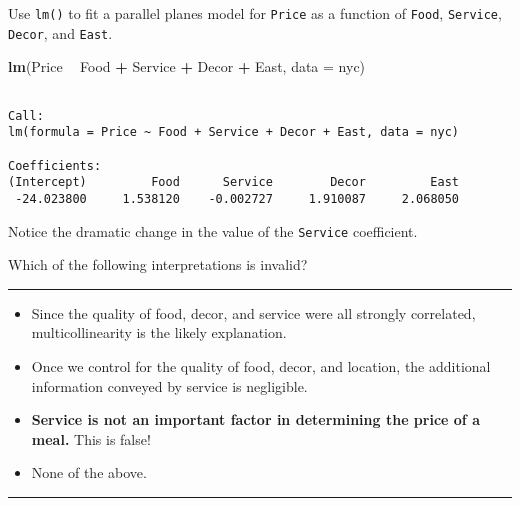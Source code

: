 \documentclass[]{book}
\newenvironment{Shaded}{\begin{snugshade}}{\end{snugshade}}
\newcommand{\KeywordTok}[1]{\textcolor[rgb]{0.13,0.29,0.53}{\textbf{#1}}}
\newcommand{\DataTypeTok}[1]{\textcolor[rgb]{0.13,0.29,0.53}{#1}}
\newcommand{\StringTok}[1]{\textcolor[rgb]{0.31,0.60,0.02}{#1}}
\newcommand{\OperatorTok}[1]{\textcolor[rgb]{0.81,0.36,0.00}{\textbf{#1}}}
\newcommand{\NormalTok}[1]{#1}
\begin{document}
Use \texttt{lm()} to fit a parallel planes model for \texttt{Price} as a
function of \texttt{Food}, \texttt{Service}, \texttt{Decor}, and
\texttt{East}.

\begin{Shaded}
\begin{Highlighting}[]
\KeywordTok{lm}\NormalTok{(Price }\OperatorTok{~}\StringTok{ }\NormalTok{Food }\OperatorTok{+}\StringTok{ }\NormalTok{Service }\OperatorTok{+}\StringTok{ }\NormalTok{Decor }\OperatorTok{+}\StringTok{ }\NormalTok{East, }\DataTypeTok{data =}\NormalTok{ nyc)}
\end{Highlighting}
\end{Shaded}

\begin{verbatim}

Call:
lm(formula = Price ~ Food + Service + Decor + East, data = nyc)

Coefficients:
(Intercept)         Food      Service        Decor         East  
 -24.023800     1.538120    -0.002727     1.910087     2.068050  
\end{verbatim}

Notice the dramatic change in the value of the \texttt{Service}
coefficient.

Which of the following interpretations is invalid?

\begin{center}\rule{0.5\linewidth}{\linethickness}\end{center}

\begin{itemize}
\item
  Since the quality of food, decor, and service were all strongly
  correlated, multicollinearity is the likely explanation.
\item
  Once we control for the quality of food, decor, and location, the
  additional information conveyed by service is negligible.
\item
  \textbf{Service is not an important factor in determining the price of
  a meal.} This is false!
\item
  None of the above.
\end{itemize}

\begin{center}\rule{0.5\linewidth}{\linethickness}\end{center}


\end{document}
